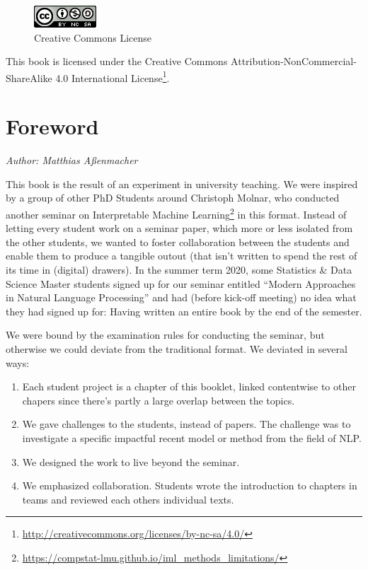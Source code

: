 \documentclass[]{krantz}
\providecommand{\tightlist}{%
  \setlength{\itemsep}{0pt}\setlength{\parskip}{0pt}}
\renewcommand{\href}[2]{#2\footnote{\url{#1}}}
\begin{document}
\begin{figure}
\centering
\includegraphics{figures/by-nc-sa.png}
\caption{Creative Commons License}
\end{figure}

This book is licensed under the \href{http://creativecommons.org/licenses/by-nc-sa/4.0/}{Creative Commons Attribution-NonCommercial-ShareAlike 4.0 International License}.

\mainmatter

\hypertarget{foreword}{%
\chapter*{Foreword}\label{foreword}}


\emph{Author: Matthias Aßenmacher}

This book is the result of an experiment in university teaching. We were inspired by a group of other PhD Students around Christoph Molnar, who conducted another \href{https://compstat-lmu.github.io/iml_methods_limitations/}{seminar on Interpretable Machine Learning} in this format.
Instead of letting every student work on a seminar paper, which more or less isolated from the other students, we wanted to foster collaboration between the students and enable them to produce a tangible outout (that isn't written to spend the rest of its time in (digital) drawers).
In the summer term 2020, some Statistics \& Data Science Master students signed up for our seminar entitled ``Modern Approaches in Natural Language Processing'' and had (before kick-off meeting) no idea what they had signed up for: Having written an entire book by the end of the semester.

We were bound by the examination rules for conducting the seminar, but otherwise we could deviate from the traditional format.
We deviated in several ways:

\begin{enumerate}
\def\labelenumi{\arabic{enumi}.}
\tightlist
\item
  Each student project is a chapter of this booklet, linked contentwise to other chapers since there's partly a large overlap between the topics.
\item
  We gave challenges to the students, instead of papers. The challenge was to investigate a specific impactful recent model or method from the field of NLP.
\item
  We designed the work to live beyond the seminar.
\item
  We emphasized collaboration. Students wrote the introduction to chapters in teams and reviewed each others individual texts.
\end{enumerate}
\end{document}
